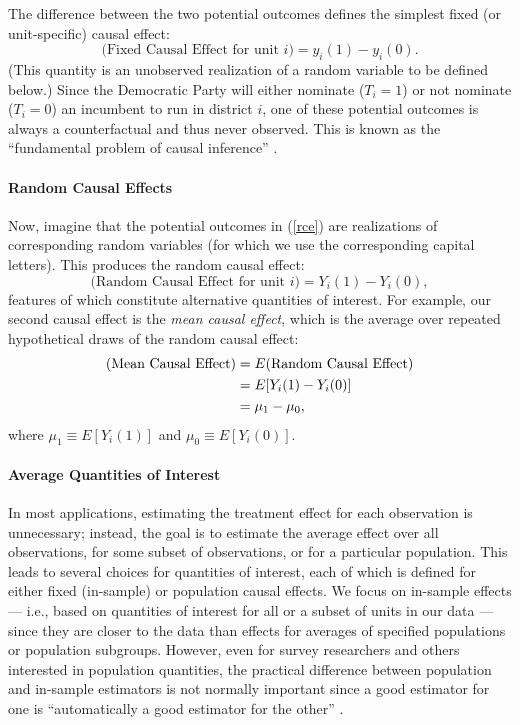 \documentclass[11pt,titlepage]{article}
\begin{document}
The difference between the two potential outcomes defines the simplest
fixed (or unit-specific) causal effect:
\begin{equation}
  \label{rce}
  \text{(Fixed Causal Effect for unit $i$)} = y_i(1) - y_i(0).
\end{equation}
(This quantity is an unobserved realization of a random variable to be
defined below.)  Since the Democratic Party will either nominate
($T_i=1$) or not nominate ($T_i=0$) an incumbent to run in district
$i$, one of these potential outcomes is always a counterfactual and
thus never observed. This is known as the ``fundamental problem of
causal inference'' \citep{Holland86}.

\paragraph{Random Causal Effects} 
Now, imagine that the potential outcomes in (\ref{rce}) are
realizations of corresponding random variables (for which we use the
corresponding capital letters).  This produces the random causal
effect:
\begin{equation}
  \label{rance}
  \text{(Random Causal Effect for unit $i$)}  = Y_i(1) - Y_i(0),
\end{equation}
features of which constitute alternative quantities of interest.  For
example, our second causal effect is the \emph{mean causal effect},
which is the average over repeated hypothetical draws of the random
causal effect:
\begin{align}
  \label{meance} \text{(Mean Causal Effect)}
  &= E(\text{Random Causal Effect})\\
  &= E[Y_i(1) - Y_i(0)]\\ \notag &= \mu_1 - \mu_0,
\end{align}
where $\mu_1\equiv E[Y_i(1)]$ and $\mu_0\equiv E[Y_i(0)]$.

\paragraph{Average Quantities of Interest}
In most applications, estimating the treatment effect for each
observation is unnecessary; instead, the goal is to estimate the
average effect over all observations, for some subset of observations,
or for a particular population.  This leads to several choices for
quantities of interest, each of which is defined for either fixed
(in-sample) or population causal effects.  We focus on in-sample
effects --- i.e., based on quantities of interest for all or a subset
of units in our data --- since they are closer to the data than
effects for averages of specified populations or population subgroups.
However, even for survey researchers and others interested in
population quantities, the practical difference between population and
in-sample estimators is not normally important since a good estimator
for one is ``automatically a good estimator for the other''
\citep[p.6]{Imbens04}.
\end{document}
